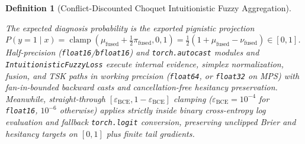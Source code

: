 \documentclass[10pt,twocolumn]{article}
\newtheorem{definition}{Definition}
\begin{document}
\begin{definition}[Conflict-Discounted Choquet Intuitionistic Fuzzy Aggregation]
\begin{enumerate}[leftmargin=1.4em,itemsep=1pt]
\end{enumerate}
The expected diagnosis probability is the exported pignistic projection $P(y=1\mid x) =
\operatorname{clamp}(\mu_{\text{fused}} + \frac{1}{2}\pi_{\text{fused}}, 0, 1) = \frac{1}{2}(1
+ \mu_{\text{fused}} - \nu_{\text{fused}}) \in [0, 1]$. Half-precision
(\texttt{float16}/\texttt{bfloat16}) and \texttt{torch.autocast} modules and
\texttt{Intuitionistic\allowbreak Fuzzy\allowbreak Loss} execute internal evidence, simplex
normalization, fusion, and TSK paths in working precision (\texttt{float64}, or
\texttt{float32} on MPS) with fan-in-bounded backward casts and cancellation-free hesitancy
preservation. Meanwhile, straight-through $[\varepsilon_{\text{BCE}},
1-\varepsilon_{\text{BCE}}]$ clamping ($\varepsilon_{\text{BCE}}=10^{-4}$ for \texttt{float16},
$10^{-6}$ otherwise) applies strictly inside binary cross-entropy log evaluation and fallback
\texttt{torch.logit} conversion, preserving unclipped Brier and hesitancy targets on $[0,1]$
plus finite tail gradients.
\end{definition}
\end{document}
